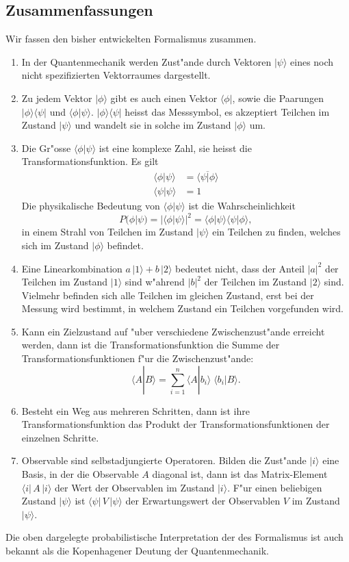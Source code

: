 \subsection{Zusammenfassungen}
Wir fassen den bisher entwickelten Formalismus zusammen.

\begin{enumerate}
\item
In der Quantenmechanik werden Zust"ande durch Vektoren $|\psi\rangle$
eines noch nicht spezifizierten Vektorraumes dargestellt.
\item
Zu jedem Vektor $|\phi\rangle$ gibt es auch einen Vektor $\langle \phi|$,
sowie die Paarungen
$|\phi\rangle\langle\psi|$
und
$\langle\phi|\psi\rangle$.
$|\phi\rangle\langle\psi|$ heisst das Messsymbol, es akzeptiert Teilchen im
Zustand $|\psi\rangle$ und wandelt sie in solche im Zustand $|\phi\rangle$
um.
\item
Die Gr"osse $\langle \phi|\psi\rangle$ ist eine komplexe Zahl, sie
heisst die Transformationsfunktion. Es gilt
\begin{align*}
\langle \phi|\psi\rangle
&=
\overline{
\langle \psi|\phi\rangle
}
\\
\langle\psi|\psi\rangle&=1
\end{align*}
Die physikalische Bedeutung von $\langle\phi|\psi\rangle$ ist die
Wahrscheinlichkeit
\[
P(\phi|\psi)=|\langle \phi|\psi\rangle|^2=
\langle\phi|\psi\rangle
\langle\psi|\phi\rangle,
\]
in einem Strahl von Teilchen im Zustand $|\psi\rangle$ ein Teilchen zu
finden, welches sich im Zustand $|\phi\rangle$ befindet.
\item
Eine Linearkombination $a\,|1\rangle + b\,|2\rangle$ bedeutet nicht,
dass der Anteil $|a|^2$ der Teilchen im Zustand $|1\rangle$ sind
w"ahrend $|b|^2$ der Teilchen im Zustand $|2\rangle$ sind.
Vielmehr befinden sich alle Teilchen im gleichen Zustand,
erst bei der Messung wird bestimmt, in welchem Zustand ein Teilchen
vorgefunden wird.
\item
Kann ein Zielzustand auf "uber verschiedene Zwischenzust"ande
erreicht werden, dann ist die Transformationsfunktion die Summe
der Transformationsfunktionen f"ur die Zwischenzust"ande:
\[
\langle A|B\rangle
=
\sum_{i=1}^n\langle A|b_i\rangle\;\langle b_i|B\rangle.
\]
\item
Besteht ein Weg aus mehreren Schritten, dann ist ihre Transformationsfunktion
das Produkt der Transformationsfunktionen der einzelnen Schritte.
\item 
Observable sind selbstadjungierte Operatoren.
Bilden die Zust"ande $|i\rangle$ eine Basis, in der die Observable $A$ 
diagonal ist, dann ist das Matrix-Element $\langle i|\,A\,|i\rangle$ der
Wert der Observablen im Zustand $|i\rangle$. F"ur einen beliebigen
Zustand $|\psi\rangle$ ist $\langle\psi|\,V\,|\psi\rangle$ der Erwartungswert
der Observablen $V$ im Zustand $|\psi\rangle$.
\end{enumerate}
Die oben dargelegte probabilistische Interpretation der des Formalismus
ist auch bekannt als die Kopenhagener Deutung der Quantenmechanik.

